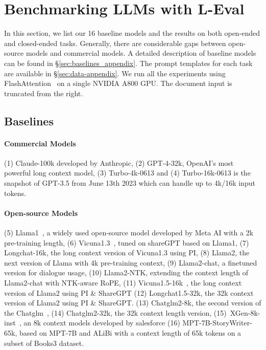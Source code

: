 \section{Benchmarking LLMs with L-Eval}
In this section, we list our 16 baseline models and the results on both open-ended and closed-ended tasks. Generally, there are considerable gaps between open-source models and commercial models. A detailed description of baseline models can be found in \S\ref{sec:baselines_appendix}.  The prompt templates for each task are available in \S\ref{sec:data-appendix}. We run all the experiments using FlashAttention~\citep{NEURIPS2022_67d57c32} on a single NVIDIA A800 GPU. The document input is truncated from the right.

\vspace{-0.5em}
\subsection{Baselines}\label{sec:baselines}
\vspace{-0.3em}
\paragraph{Commercial Models}
(1) {Claude-100k} developed by Anthropic, (2) GPT-4-32k, OpenAI's most powerful long context model, (3)
{Turbo-4k-0613} and (4) Turbo-16k-0613 is the snapshot of {GPT-3.5} from June 13th 2023 which can handle up to 4k/16k input tokens.
\vspace{-0.7em}
\paragraph{Open-source Models}
(5) {Llama1}~\citep{touvron2023llama}, a widely used open-source model developed by Meta AI with a 2k pre-training length, (6) {Vicuna1.3}~\citep{vicuna2023}, tuned on shareGPT based on Llama1, (7) Longchat-16k, the long context version of Vicuna1.3 using PI, (8) Llama2, the next version of Llama with 4k pre-training context, (9) Llama2-chat, a finetuned version for dialogue usage, (10) Llama2-NTK, extending the context length of Llama2-chat with NTK-aware RoPE, (11) Vicuna1.5-16k~\citep{zheng2023judging}, the long context version of Llama2 using PI \& ShareGPT (12) Longchat1.5-32k, the 32k context version of Llama2 using PI \& ShareGPT.
(13) {Chatglm2-8k}, the second version of the Chatglm~\citep{du2022glm}, (14) Chatglm2-32k, the 32k context length version,  (15)\ {XGen-8k-inst}~\citep{XGen}, an 8k context models developed by salesforce  (16) {MPT-7B-StoryWriter-65k}, based on MPT-7B and ALiBi with a context length of 65k tokens on a subset of Books3 dataset.
\vspace{-0.7em}
